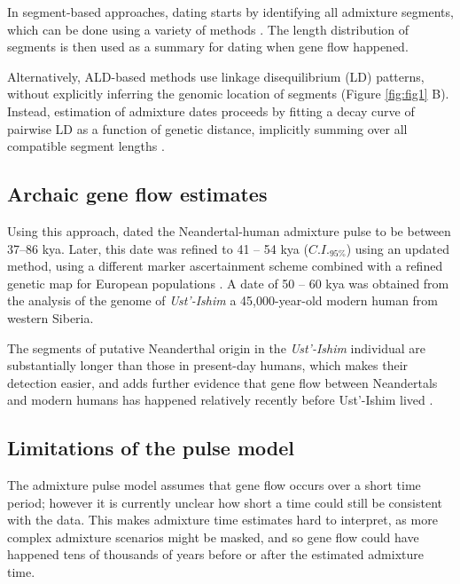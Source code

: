 \documentclass[11pt]{article}
\begin{document}
In segment-based approaches, dating starts by identifying all admixture segments, which can be done using a variety of methods \citep{seguin_orlando_paleogenomics_2014,sankararaman_combined_2016,vernot_excavating_2016,racimo_signatures_2017,skov_detecting_2018}. The length distribution of segments is then used as a summary for dating when gene flow happened.

Alternatively, ALD-based methods use linkage disequilibrium (LD) patterns, without explicitly inferring the genomic location of segments \citep{chimusa_dating_2018} (Figure \ref{fig:fig1} B). Instead, estimation of admixture dates proceeds by fitting a decay curve of pairwise LD as a function of genetic distance, implicitly summing over all compatible segment lengths \citep{moorjani_history_2011,loh_inferring_2013}. 


\subsection{Archaic gene flow estimates}
Using this approach,   \cite{sankararaman_date_2012} dated the Neandertal-human admixture pulse to be  between 37--86 kya. Later, this date was refined to 41 -- 54 kya ($C.I._{95\%}$) using an updated method, using a different marker ascertainment scheme combined with a refined genetic map for European populations \citep{moorjani_genetic_2016}. A date of 50 -- 60 kya was obtained from the analysis of the genome of \textit{Ust'-Ishim} a 45,000-year-old modern human from western Siberia.

The segments of putative Neanderthal origin in the \textit{Ust'-Ishim} individual are substantially longer than those in present-day humans, which makes their detection easier, and adds further evidence that gene flow between Neandertals and modern humans has happened relatively recently before Ust'-Ishim lived \citep{fu_genome_2014}.


\subsection{Limitations of the pulse model}\label{Why can't we us the pulse model}

The admixture pulse model assumes that gene flow occurs over a short time period; however it is currently unclear how short a time could still be consistent with the data. This makes admixture time estimates hard to interpret, as more complex admixture scenarios might be masked, and so gene flow could have happened tens of thousands of years before or after the estimated admixture time.
\end{document}

